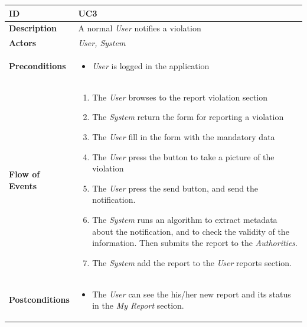 



\begin{table}[H]
\begin{tabular}{|l|p{}|}
\hline
\textbf{ID}             & UC3                                                                             \\ \hline
\textbf{Description}    & A normal \textit{User} notifies a violation \\ \hline
\textbf{Actors}         &  \textit{User, System}                                                                       \\ \hline

\textbf{Preconditions}  &   \begin{itemize}

 \item \textit{User} is logged in the application
                 \end{itemize}     
                    \\ \hline
                    
\textbf{Flow of Events} &   \begin{enumerate}
    \item The \textit{User} browses to the report violation section
    \item The \textit{System} return the form for reporting a violation
    \item The \textit{User} fill in the form with the mandatory data
    \item The \textit{User} press the button to take a picture of the violation
    \item The \textit{User} press the send button, and send the notification.
    \item The \textit{System} runs an algorithm to extract metadata about the notification, and to check the validity of the information. Then submits the report to the \textit{Authorities}.
    \item The \textit{System} add the report to the \textit{User} reports section. 

\end{enumerate}                                                                             \\ \hline
\textbf{Postconditions} & \begin{itemize}
     
 \item The \textit{User} can see the his/her new report and its status in the \textit{My Report} section. 
 

\end{itemize}
\end{tabular}
\end{table}
